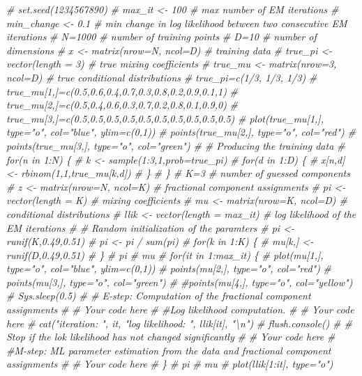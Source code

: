 \documentclass[]{article}
\newenvironment{Shaded}{\begin{snugshade}}{\end{snugshade}}
\newcommand{\CommentTok}[1]{\textcolor[rgb]{0.56,0.35,0.01}{\textit{#1}}}
\begin{document}
\begin{Shaded}
\begin{Highlighting}[]
\CommentTok{# set.seed(1234567890)}
\CommentTok{# max_it <- 100 # max number of EM iterations}
\CommentTok{# min_change <- 0.1 # min change in log likelihood between two consecutive EM iterations}
\CommentTok{# N=1000 # number of training points}
\CommentTok{# D=10 # number of dimensions}
\CommentTok{# x <- matrix(nrow=N, ncol=D) # training data}
\CommentTok{# true_pi <- vector(length = 3) # true mixing coefficients}
\CommentTok{# true_mu <- matrix(nrow=3, ncol=D) # true conditional distributions}
\CommentTok{# true_pi=c(1/3, 1/3, 1/3)}
\CommentTok{# true_mu[1,]=c(0.5,0.6,0.4,0.7,0.3,0.8,0.2,0.9,0.1,1)}
\CommentTok{# true_mu[2,]=c(0.5,0.4,0.6,0.3,0.7,0.2,0.8,0.1,0.9,0)}
\CommentTok{# true_mu[3,]=c(0.5,0.5,0.5,0.5,0.5,0.5,0.5,0.5,0.5,0.5)}
\CommentTok{# plot(true_mu[1,], type="o", col="blue", ylim=c(0,1))}
\CommentTok{# points(true_mu[2,], type="o", col="red")}
\CommentTok{# points(true_mu[3,], type="o", col="green")}
\CommentTok{# # Producing the training data}
\CommentTok{# for(n in 1:N) \{}
\CommentTok{# k <- sample(1:3,1,prob=true_pi)}
\CommentTok{# for(d in 1:D) \{}
\CommentTok{# x[n,d] <- rbinom(1,1,true_mu[k,d])}
\CommentTok{# \}}
\CommentTok{# \}}
\CommentTok{# K=3 # number of guessed components}
\CommentTok{# z <- matrix(nrow=N, ncol=K) # fractional component assignments}
\CommentTok{# pi <- vector(length = K) # mixing coefficients}
\CommentTok{# mu <- matrix(nrow=K, ncol=D) # conditional distributions}
\CommentTok{# llik <- vector(length = max_it) # log likelihood of the EM iterations}
\CommentTok{# # Random initialization of the paramters}
\CommentTok{# pi <- runif(K,0.49,0.51)}
\CommentTok{# pi <- pi / sum(pi)}
\CommentTok{# for(k in 1:K) \{}
\CommentTok{# mu[k,] <- runif(D,0.49,0.51)}
\CommentTok{# \}}
\CommentTok{# pi}
\CommentTok{# mu}
\CommentTok{# for(it in 1:max_it) \{}
\CommentTok{# plot(mu[1,], type="o", col="blue", ylim=c(0,1))}
\CommentTok{# points(mu[2,], type="o", col="red")}
\CommentTok{# points(mu[3,], type="o", col="green")}
\CommentTok{# #points(mu[4,], type="o", col="yellow")}
\CommentTok{# Sys.sleep(0.5)}
\CommentTok{# # E-step: Computation of the fractional component assignments}
\CommentTok{# # Your code here}
\CommentTok{# #Log likelihood computation.}
\CommentTok{# # Your code here}
\CommentTok{# cat("iteration: ", it, "log likelihood: ", llik[it], "\textbackslash{}n")}
\CommentTok{# flush.console()}
\CommentTok{# # Stop if the lok likelihood has not changed significantly}
\CommentTok{# # Your code here}
\CommentTok{# #M-step: ML parameter estimation from the data and fractional component assignments}
\CommentTok{# # Your code here}
\CommentTok{# \}}
\CommentTok{# pi}
\CommentTok{# mu}
\CommentTok{# plot(llik[1:it], type="o")}
\end{Highlighting}
\end{Shaded}
\end{document}
